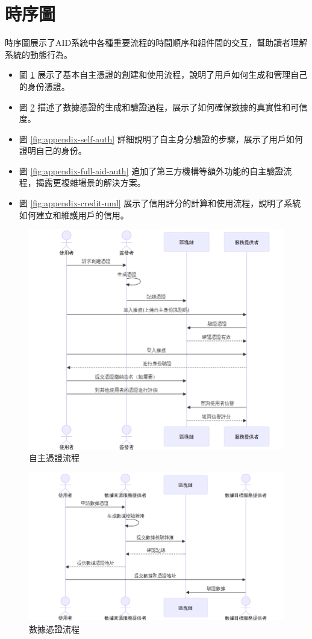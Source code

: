 \section{時序圖}
時序圖展示了AID系統中各種重要流程的時間順序和組件間的交互，幫助讀者理解系統的動態行為。
\begin{itemize}
  \item 圖 \ref{fig:appendix-ca-uml} 展示了基本自主憑證的創建和使用流程，說明了用戶如何生成和管理自己的身份憑證。
  \item 圖 \ref{fig:appendix-da-uml} 描述了數據憑證的生成和驗證過程，展示了如何確保數據的真實性和可信度。
  \item 圖 \ref{fig:appendix-self-auth} 詳細說明了自主身分驗證的步驟，展示了用戶如何證明自己的身份。
  \item 圖 \ref{fig:appendix-full-aid-auth} 追加了第三方機構等額外功能的自主驗證流程，揭露更複雜場景的解決方案。
  \item 圖 \ref{fig:appendix-credit-uml} 展示了信用評分的計算和使用流程，說明了系統如何建立和維護用戶的信用。
\end{itemize}
\begin{figure}[p]
  \centering
  \includegraphics[width=\linewidth]{figures/CA-UML.png}
  \caption{自主憑證流程}
  \label{fig:appendix-ca-uml}
\end{figure}
\clearpage
\begin{figure}[p]
  \centering
  \includegraphics[width=\linewidth]{figures/DA-UML.png}
  \caption{數據憑證流程}
  \label{fig:appendix-da-uml}
\end{figure}
